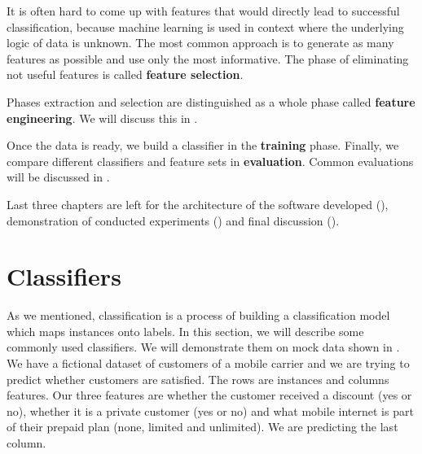 It is often hard to come up with features that would directly lead to successful classification,
because machine learning is used in context where the underlying logic of data is unknown.
The most common approach is to generate as many features as possible and use only the most informative.
The phase of eliminating not useful features is called \textbf{feature selection}.

Phases extraction and selection are distinguished as a whole phase called \textbf{feature engineering}.
We will discuss this in .
 


Once the data is ready, we build a classifier in the \textbf{training} phase.
Finally, we compare different classifiers and feature sets in \textbf{evaluation}.
Common evaluations will be discussed in .

Last three chapters  are left for the architecture of the software developed (),
demonstration of conducted experiments () and final discussion ().



\section{}


\subsection{}

\subsection{}


\section{Classifiers}
\label{chap:clscon}

As we mentioned, classification is a process of building a classification model which maps
instances onto labels.
In this section, we will describe some commonly used classifiers.
We will demonstrate them on mock data shown in .
We have a fictional dataset of customers of a mobile carrier and
we are trying to predict whether customers are satisfied.
The rows are instances and columns features.
Our three features are 
whether the customer received a discount (yes or no), whether it is a private customer (yes or no)
and what mobile internet is part of their prepaid plan (none, limited and unlimited).
We are predicting the last column.

